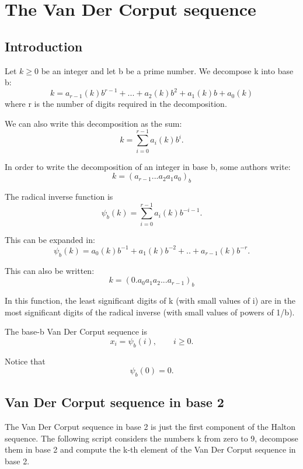 %

    \chapter{The Van Der Corput sequence}


\section{Introduction}

Let $k\geq 0$ be an integer and let b be a prime number.
We decompose k into base b:
$$
        k=a_{r-1}(k) b^{r-1} + ...+ a_2(k) b^2 + a_1(k) b + a_0(k)
$$
where r is the number of digits required in the decomposition.

We can also write this decomposition as the sum:
$$
        k=\sum_{i=0}^{r-1} a_i(k) b^i.
$$

In order to write the decomposition of an 
integer in base b, some authors write:
$$
        k=(a_{r-1}...a_2 a_1 a_0)_b
$$

The radical inverse function is
$$
        \psi_b(k)=\sum_{i=0}^{r-1} a_{i}(k)b^{-i-1}.
$$

This can be expanded in:
$$
        \psi_b(k)=a_0(k)b^{-1} + a_1(k)b^{-2} + .. + a_{r-1}(k)b^{-r}.
$$

This can also be written:
$$
        k=(0.a_0 a_1 a_2 ... a_{r-1})_b
$$

In this function, the least significant digits of k (with small values of i)
are in the most significant digits of the radical inverse
(with small values of powers of 1/b).

The base-b Van Der Corput sequence\cite{vdc1935} is 
$$
        x_i=\psi_b(i), \qquad i \geq 0.
$$

Notice that
$$
        \psi_b(0)=0.
$$


\section{Van Der Corput sequence in base 2}

The Van Der Corput sequence in base 2 is just the first component
of the Halton sequence.
The following script considers the numbers k from
zero to 9, decompose them in base 2 and compute the
k-th element of the Van Der Corput sequence in base 2.

